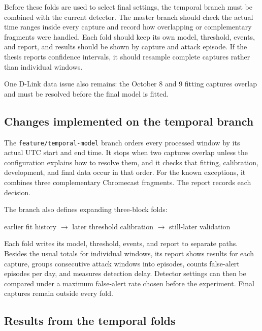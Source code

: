 Before these folds are used to select final settings, the temporal branch must be
combined with the current detector. The master branch should check the actual
time ranges inside every capture and record how overlapping or complementary
fragments were handled. Each fold should keep its own model, threshold, events,
and report, and results should be shown by capture and attack episode. If the
thesis reports confidence intervals, it should resample complete captures rather
than individual windows.

One D-Link data issue also remains: the October 8 and 9 fitting captures overlap
and must be resolved before the final model is fitted.

\subsection{Changes implemented on the temporal branch}

The \texttt{feature/temporal-model} branch orders every processed window by its
actual UTC start and end time. It stops when two captures overlap unless the
configuration explains how to resolve them, and it checks that fitting,
calibration, development, and final data occur in that order. For the known
exceptions, it combines three complementary Chromecast fragments. The report
records each decision.

The branch also defines expanding three-block folds:

\begin{center}
earlier fit history $\longrightarrow$ later threshold calibration
$\longrightarrow$ still-later validation
\end{center}

Each fold writes its model, threshold, events, and report to separate paths.
Besides the usual totals for individual windows, its report shows results for
each capture, groups consecutive attack windows into episodes, counts false-alert
episodes per day, and measures detection delay. Detector settings can then be
compared under a maximum false-alert rate chosen before the experiment. Final
captures remain outside every fold.

\subsection{Results from the temporal folds}

